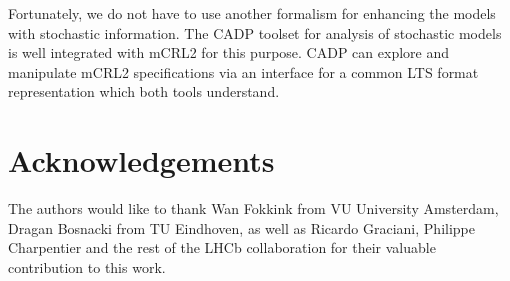 \documentclass[sort&compress,preprint,3p]{elsarticle}
\begin{document}
Fortunately, we do not have to use another formalism for enhancing the models with stochastic information. The CADP toolset \cite{CADP2010} for analysis of stochastic models is well integrated with mCRL2 for this purpose. CADP can explore and manipulate mCRL2 specifications via an interface for a common LTS format representation \cite{CADPPerformanceEval} which both tools understand. 
\section*{Acknowledgements}
The authors would like to thank Wan Fokkink from VU University Amsterdam, Dragan Bosnacki from TU Eindhoven,
as well as Ricardo Graciani, Philippe Charpentier and the rest of the LHCb collaboration for their valuable contribution to this work.
 

\end{document}
